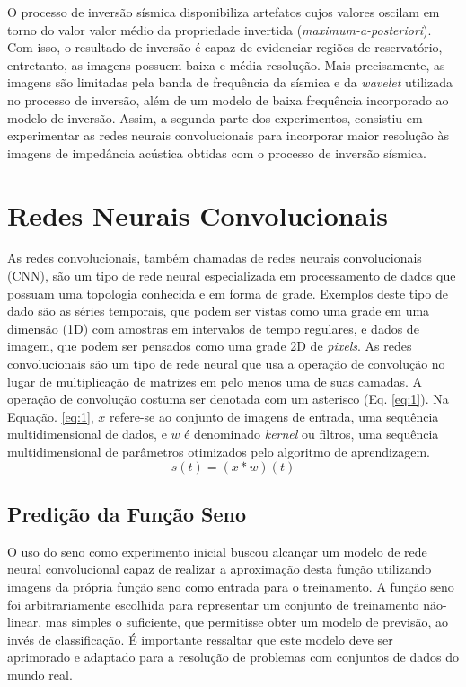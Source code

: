 \documentclass[11pt]{article}
\begin{document}
O processo de inversão sísmica disponibiliza artefatos cujos valores oscilam em torno
do valor valor médio da propriedade invertida (\textit{maximum-a-posteriori}). Com isso,
o resultado de inversão é capaz de evidenciar regiões de reservatório, entretanto,
as imagens possuem baixa e média resolução. Mais precisamente, as imagens são limitadas
pela banda de frequência da sísmica e da \textit{wavelet} utilizada no processo de inversão, além de um modelo
de baixa frequência incorporado ao modelo de inversão.
Assim, a segunda parte dos experimentos, consistiu em experimentar as redes neurais convolucionais
para incorporar maior resolução às imagens de impedância acústica obtidas com o processo
de inversão sísmica. 

\section{Redes Neurais Convolucionais}

As redes convolucionais, também chamadas de redes neurais convolucionais (CNN),
são um tipo de rede neural especializada em processamento de dados que possuam uma
topologia conhecida e em forma de grade. Exemplos deste tipo de dado são as séries
temporais, que podem ser vistas como uma grade em uma dimensão (1D) com amostras
em intervalos de tempo regulares, e dados de imagem, que podem ser pensados como
uma grade 2D de \textit{pixels}. As redes convolucionais são um tipo de rede neural
que usa a operação de convolução no lugar de multiplicação de matrizes em pelo menos uma
de suas camadas. A operação de convolução costuma ser denotada com um asterisco (Eq. \ref{eq:1}).
Na Equação. \ref{eq:1}, $x$ refere-se ao conjunto de imagens de entrada, uma sequência multidimensional
de dados, e $w$ é denominado \textit{kernel} ou filtros, uma sequência multidimensional de parâmetros otimizados pelo algoritmo
de aprendizagem.
\begin{equation}
 s(t) = (x * w)(t)
 \label{eq:1}
\end{equation}

\subsection{Predição da Função Seno}
O uso do seno como experimento inicial buscou alcançar um modelo de
rede neural convolucional capaz de realizar a aproximação desta função utilizando
imagens da própria função seno como entrada para o treinamento.
A função seno foi arbitrariamente escolhida para
representar um conjunto de treinamento não-linear, mas simples o
suficiente, que permitisse obter um modelo de previsão,
ao invés de classificação. É importante ressaltar que este modelo deve ser
aprimorado e adaptado para a resolução de problemas com conjuntos de dados
do mundo real.
\end{document}
